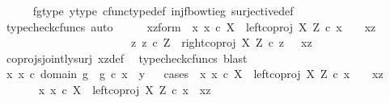 \begin{isabellebody}
\ \ \ \ \isamarkupfalse%
\ fg{\isacharunderscore}{\kern0pt}type\ y{\isacharunderscore}{\kern0pt}type{}\ cfunc{\isacharunderscore}{\kern0pt}type{\isacharunderscore}{\kern0pt}def\ inj{\isacharunderscore}{\kern0pt}f{\isacharunderscore}{\kern0pt}bowtie{\isacharunderscore}{\kern0pt}g\ surjective{\isacharunderscore}{\kern0pt}def\ \isamarkupfalse%
\ {\isacharparenleft}{\kern0pt}typecheck{\isacharunderscore}{\kern0pt}cfuncs{\isacharcomma}{\kern0pt}\ auto{\isacharparenright}{\kern0pt}\isanewline
\ \ \isamarkupfalse%
\ \isamarkupfalse%
\ xz{\isacharunderscore}{\kern0pt}form{\isacharcolon}{\kern0pt}\ {\isachardoublequoteopen}{\isacharparenleft}{\kern0pt}{\isasymexists}\ x{\isachardot}{\kern0pt}\ x\ {\isasymin}\isactrlsub c\ X\ {\isasymand}\ left{\isacharunderscore}{\kern0pt}coproj\ X\ Z\ {\isasymcirc}\isactrlsub c\ x\ {\isacharequal}{\kern0pt}\ \ \ xz{\isacharparenright}{\kern0pt}\ {\isasymor}\ \ \isanewline
\ \ \ \ \ \ \ \ \ \ \ \ \ \ \ \ \ \ \ \ \ \ {\isacharparenleft}{\kern0pt}{\isasymexists}\ z{\isachardot}{\kern0pt}\ z\ {\isasymin}\isactrlsub c\ Z\ {\isasymand}\ right{\isacharunderscore}{\kern0pt}coproj\ X\ Z\ {\isasymcirc}\isactrlsub c\ z\ {\isacharequal}{\kern0pt}\ \ xz{\isacharparenright}{\kern0pt}{\isachardoublequoteclose}\isanewline
\ \ \ \ \isamarkupfalse%
\ coprojs{\isacharunderscore}{\kern0pt}jointly{\isacharunderscore}{\kern0pt}surj\ xz{\isacharunderscore}{\kern0pt}def\ \isamarkupfalse%
\ {\isacharparenleft}{\kern0pt}typecheck{\isacharunderscore}{\kern0pt}cfuncs{\isacharcomma}{\kern0pt}\ blast{\isacharparenright}{\kern0pt}\isanewline
\ \ \isamarkupfalse%
\ {\isachardoublequoteopen}{\isasymexists}x{\isachardot}{\kern0pt}\ x\ {\isasymin}\isactrlsub c\ domain\ g\ {\isasymand}\ g\ {\isasymcirc}\isactrlsub c\ x\ {\isacharequal}{\kern0pt}\ y{\isachardoublequoteclose}\isanewline
\ \ \isamarkupfalse%
{\isacharparenleft}{\kern0pt}cases\ {\isachardoublequoteopen}{\isasymexists}\ x{\isachardot}{\kern0pt}\ x\ {\isasymin}\isactrlsub c\ X\ {\isasymand}\ left{\isacharunderscore}{\kern0pt}coproj\ X\ Z\ {\isasymcirc}\isactrlsub c\ x\ {\isacharequal}{\kern0pt}\ \ \ xz{\isachardoublequoteclose}{\isacharparenright}{\kern0pt}\isanewline
\ \ \ \ \isamarkupfalse%
\ {\isachardoublequoteopen}{\isasymexists}\ x{\isachardot}{\kern0pt}\ x\ {\isasymin}\isactrlsub c\ X\ {\isasymand}\ left{\isacharunderscore}{\kern0pt}coproj\ X\ Z\ {\isasymcirc}\isactrlsub c\ x\ {\isacharequal}{\kern0pt}\ xz{\isachardoublequoteclose}\isanewline

\end{isabellebody}
